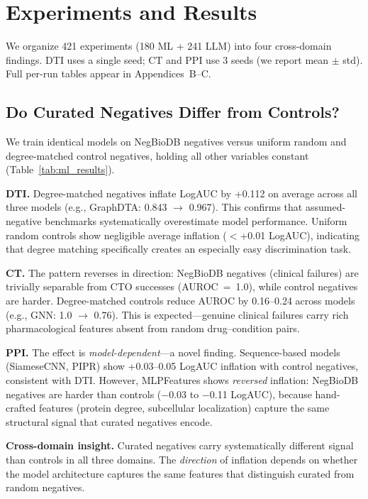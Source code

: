 \section{Experiments and Results}
\label{sec:experiments}

We organize 421 experiments (180 ML + 241 LLM) into four cross-domain findings. DTI uses a single seed; CT and PPI use 3 seeds (we report mean $\pm$ std). Full per-run tables appear in Appendices~B--C.

\subsection{Do Curated Negatives Differ from Controls?}
\label{sec:exp-inflation}

We train identical models on NegBioDB negatives versus uniform random and degree-matched control negatives, holding all other variables constant (Table~\ref{tab:ml_results}).

\textbf{DTI.} Degree-matched negatives inflate LogAUC by +0.112 on average across all three models (e.g., GraphDTA: 0.843 $\to$ 0.967). This confirms that assumed-negative benchmarks systematically overestimate model performance. Uniform random controls show negligible average inflation ($<$+0.01 LogAUC), indicating that degree matching specifically creates an especially easy discrimination task.

\textbf{CT.} The pattern reverses in direction: NegBioDB negatives (clinical failures) are trivially separable from CTO successes (AUROC~=~1.0), while control negatives are harder. Degree-matched controls reduce AUROC by 0.16--0.24 across models (e.g., GNN: 1.0 $\to$ 0.76). This is expected---genuine clinical failures carry rich pharmacological features absent from random drug--condition pairs.

\textbf{PPI.} The effect is \emph{model-dependent}---a novel finding. Sequence-based models (SiameseCNN, PIPR) show +0.03--0.05 LogAUC inflation with control negatives, consistent with DTI. However, MLPFeatures shows \emph{reversed} inflation: NegBioDB negatives are harder than controls ($-$0.03 to $-$0.11 LogAUC), because hand-crafted features (protein degree, subcellular localization) capture the same structural signal that curated negatives encode.

\textbf{Cross-domain insight.} Curated negatives carry systematically different signal than controls in all three domains. The \emph{direction} of inflation depends on whether the model architecture captures the same features that distinguish curated from random negatives.

